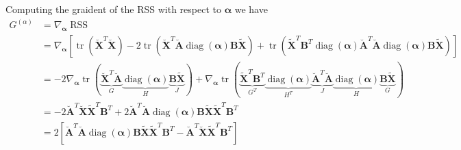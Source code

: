 \documentclass{article}
\begin{document}
Computing the graident of the RSS with respect to $\boldsymbol{\alpha}$ we have
\begin{equation}
    \label{eq:relaxed_weighted_objective_grad_alpha}
    \begin{aligned}
        G^{(\alpha)}
        &= \nabla_{\boldsymbol{\alpha}} \operatorname{RSS} \\
        &= \nabla_{\boldsymbol{\alpha}}
        \left[
            \operatorname{tr}\left( \breve{\mathbf{X}}^T \breve{\mathbf{X}} \right)
            - 2 \operatorname{tr} \left( \breve{\mathbf{X}}^T \breve{\mathbf{A}} \operatorname{diag}(\boldsymbol{\alpha}) \mathbf{B} \tilde{\mathbf{X}} \right)
            + \operatorname{tr} \left( \tilde{\mathbf{X}}^T \mathbf{B}^T \operatorname{diag}(\boldsymbol{\alpha}) \breve{\mathbf{A}}^T \breve{\mathbf{A}} \operatorname{diag}(\boldsymbol{\alpha}) \mathbf{B} \tilde{\mathbf{X}} \right)
        \right] \\
        &=
            - 2 \nabla_{\boldsymbol{\alpha}} \operatorname{tr}(\underbrace{\breve{\mathbf{X}}^T \breve{\mathbf{A}}}_{G} \underbrace{\operatorname{diag}(\boldsymbol{\alpha})}_{H} \underbrace{\mathbf{B} \tilde{\mathbf{X}}}_{J})
            + \nabla_{\boldsymbol{\alpha}} \operatorname{tr}(\underbrace{\tilde{\mathbf{X}}^T \mathbf{B}^T }_{G^T} \underbrace{\operatorname{diag}(\boldsymbol{\alpha})}_{H^T} \underbrace{\breve{\mathbf{A}}^T \breve{\mathbf{A}}}_{J} \underbrace{\operatorname{diag}(\boldsymbol{\alpha})}_{H} \underbrace{\mathbf{B} \tilde{\mathbf{X}}}_{G}) \\
        & =
            -2 \breve{\mathbf{A}}^T \breve{\mathbf{X}} \tilde{\mathbf{X}}^T \mathbf{B}^T
            +2 \breve{\mathbf{A}}^T \breve{\mathbf{A}} \operatorname{diag}(\boldsymbol{\alpha}) \mathbf{B} \tilde{\mathbf{X}} \tilde{\mathbf{X}}^T \mathbf{B}^T  \\
        & = 2
        \left[
            \breve{\mathbf{A}}^T \breve{\mathbf{A}} \operatorname{diag}(\boldsymbol{\alpha}) \mathbf{B} \tilde{\mathbf{X}} \tilde{\mathbf{X}}^T \mathbf{B}^T
            - \breve{\mathbf{A}}^T \breve{\mathbf{X}} \tilde{\mathbf{X}}^T \mathbf{B}^T
        \right]
    \end{aligned}
\end{equation}
\end{document}
